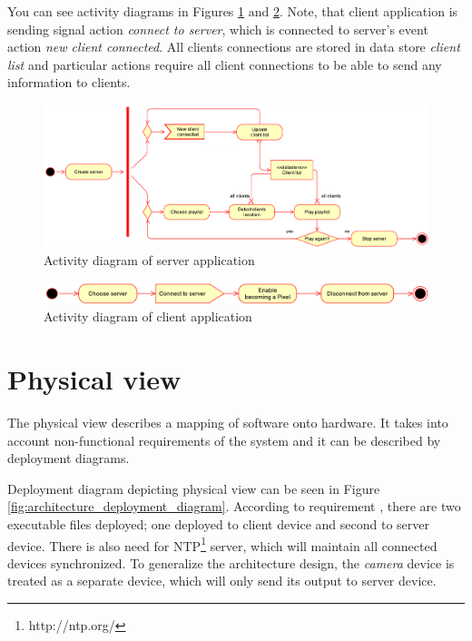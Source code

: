 You can see activity diagrams in Figures \ref{fig:activity_diagram_server} and \ref{fig:activity_diagram_client}. Note, that client application is sending signal action \emph{connect to server}, which is connected to server's event action \emph{new client connected}. 
 All clients connections are stored in data store \emph{client list} and particular actions require all client connections to be able to send any information to clients.

\begin{figure}[H]
	\centering
		\includegraphics[width=16.2cm]{softwareArchitecture/activity_server.pdf}
	\caption{Activity diagram of server application}
	\label{fig:activity_diagram_server}
\end{figure}

\begin{figure}[H]
	\centering
		\includegraphics[width=16.2cm]{softwareArchitecture/activity_client.pdf}
	\caption{Activity diagram of client application}
	\label{fig:activity_diagram_client}
\end{figure}


\section{Physical view}
The physical view \cite{Kruchten:1995:VMA:624610.625529} describes a mapping of software onto hardware. 
It takes into account non-functional requirements of the system and it can be described by deployment diagrams.

Deployment diagram depicting physical view can be seen in Figure \ref{fig:architecture_deployment_diagram}.
According to requirement , there are two executable files deployed; one deployed to client device and second to server device.
There is also need for NTP\footnote{http://ntp.org/} server, which will maintain all connected devices synchronized.
To generalize the architecture design, the \emph{camera} device is treated as a separate device, which will only send its output to server device.

